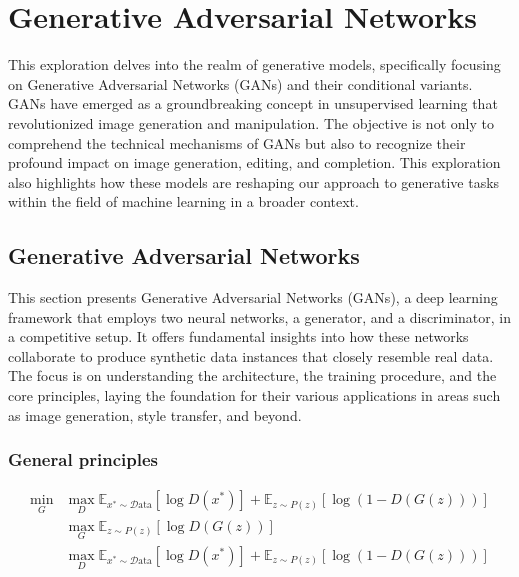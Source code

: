\chapter{Generative Adversarial Networks}
\graphicspath{{figs/2de/}}

This exploration delves into the realm of generative models, specifically focusing on Generative Adversarial Networks (GANs) and their conditional variants. GANs have emerged as a groundbreaking concept in unsupervised learning that revolutionized image generation and manipulation. The objective is not only to comprehend the technical mechanisms of GANs but also to recognize their profound impact on image generation, editing, and completion. This exploration also highlights how these models are reshaping our approach to generative tasks within the field of machine learning in a broader context.

\section{Generative Adversarial Networks}

This section presents Generative Adversarial Networks (GANs), a deep learning framework that employs two neural networks, a generator, and a discriminator, in a competitive setup. It offers fundamental insights into how these networks collaborate to produce synthetic data instances that closely resemble real data. The focus is on understanding the architecture, the training procedure, and the core principles, laying the foundation for their various applications in areas such as image generation, style transfer, and beyond.

\subsection{General principles}

\begin{align}
    \min_{G} & \max_{D} \mathbb{E}_{x^* \sim \mathcal{D}\text{ata}} \left[ \log D(x^*) \right] + \mathbb{E}_{z \sim P(z)} \left[ \log (1 - D(G(z))) \right] \label{eq:minimax}        \\
             & \max_{G} \mathbb{E}_{z \sim P(z)} \left[ \log D(G(z)) \right] \label{eq:G_maximization}                                                                                \\
             & \max_{D} \mathbb{E}_{x^* \sim \mathcal{D}\text{ata}} \left[ \log D(x^*) \right] + \mathbb{E}_{z \sim P(z)} \left[ \log (1 - D(G(z))) \right] \label{eq:D_maximization}
\end{align}

